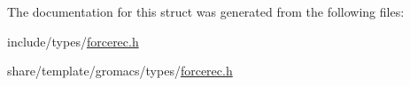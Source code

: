 \-The documentation for this struct was generated from the following files\-:\begin{DoxyCompactItemize}
\item 
include/types/\hyperlink{include_2types_2forcerec_8h}{forcerec.\-h}\item 
share/template/gromacs/types/\hyperlink{share_2template_2gromacs_2types_2forcerec_8h}{forcerec.\-h}\end{DoxyCompactItemize}
